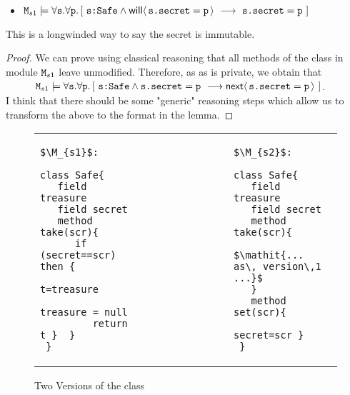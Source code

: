 \documentclass[acmsmall,screen,anonymous,review]{acmart}
\begin{document}
\begin{lemma}
~ ~

\label{lemma:secret}
\begin{itemize}
\item $\M_{s1} \models \forall \prg{s}. \forall \prg{p}.\, [ \ \prg{s:Safe} \wedge \Future{\prg{s.secret}=\prg{p} }\ \longrightarrow \ \prg{s.secret}=\prg{p}\ ]$
\end{itemize}

\end{lemma}
This is a longwinded way to say the secret is immutable.

\begin{proof} We can prove using classical reasoning that all methods of the class  in module  ${\mbox{\tt{\ensuremath{{\mbox{\tt{M}}}}}}}_{s1}$ leave  unmodified. Therefore,
as as  is private, we obtain that \\
$\strut \hspace{.4in} {\mbox{\tt{\ensuremath{{\mbox{\tt{M}}}}}}}_{s1} \models \forall {\mbox{\tt{s}}}. \forall {\mbox{\tt{p}}}.\, [ \ {\mbox{\tt{s:Safe}}} \wedge {\mbox{\tt{s.secret}}}={\mbox{\tt{p}}} \ \longrightarrow {\mathsf{next}}\langle \,{\mbox{\tt{s.secret}}}={\mbox{\tt{p}}} \,\rangle \ ] $.\\
I think that there should be some "generic" reasoning steps which allow us to transform the above to the format in the lemma.
\end{proof}

\begin{figure}[htb]
 \begin{tabular}{lll} %
\begin{minipage}{0.45\textwidth}
\begin{lstlisting}
$\M_{s1}$:

class Safe{
   field treasure 
   field secret 
   method take(scr){
      if (secret==scr) then {
         t=treasure
         treasure = null
         return t }  }
 }
\end{lstlisting}
\end{minipage}
  &\ \ \  \ \ \ \ \  \ \ \ \ \ \ &
\begin{minipage}{0.45\textwidth}
\begin{lstlisting}
$\M_{s2}$:

class Safe{
   field treasure   
   field secret  
   method take(scr){
       $\mathit{... as\, version\,1 ...}$ 
   }
   method set(scr){
         secret=scr }
 }
\end{lstlisting}
\end{minipage} 
 \end{tabular}
  \vspace*{-0.95cm}
  \caption{Two Versions of the class }
 \label{fig:ExampleSafe}
 \vspace*{-0.65cm}
 \end{figure}
 
\end{document}
